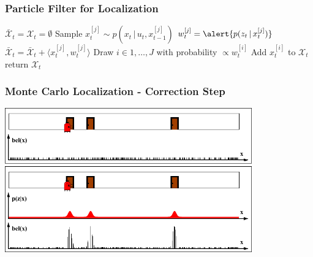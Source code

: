 \begin{frame} 
    \frametitle{Particle Filter for Localization} 
    
    \begin{algorithmic}[1] 
        \State $\bar{\mathcal{X}}_t = \mathcal{X}_t = \emptyset$ 
        \State Sample \alert{$x_t^{[j]} \sim p(x_t \, | \, u_t, x_{t-1}^{[j]})$} 
        \State $w_t^{[j]} = \alert{p(z_t \, | \, x_t^{[j]})}$ 
        \State $\bar{\mathcal{X}}_t = \bar{\mathcal{X}}_t + \langle x_t^{[j]}, w_t^{[j]}\rangle$ 
        \EndFor 
        \State Draw $i \in 1,\ldots,J$ with probability $\propto w_t^{[i]}$ 
        \State Add $x_t^{[i]}$ to $\mathcal{X}_t$ 
        \EndFor 
        \State return $\mathcal{X}_t$ 
        \EndProcedure 
    \end{algorithmic}
\end{frame}

\begin{frame}
    \frametitle{Monte Carlo Localization - Correction Step}
    
    \begin{center}
        \includegraphics[width=0.8\textwidth]{./images/particle_filter/monte_carlo_correction.pdf}
    \end{center}
    
\end{frame}
    
